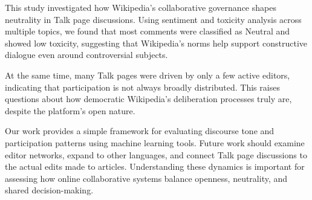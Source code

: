 
\label{sec:conclusion}

This study investigated how Wikipedia’s collaborative governance
shapes neutrality in Talk page discussions. Using sentiment and
toxicity analysis across multiple topics, we found that most comments
were classified as Neutral and showed low toxicity, suggesting that
Wikipedia’s norms help support constructive dialogue even around
controversial subjects.

At the same time, many Talk pages were driven by only a few active
editors, indicating that participation is not always broadly
distributed. This raises questions about how democratic Wikipedia’s
deliberation processes truly are, despite the platform’s open nature.

Our work provides a simple framework for evaluating discourse tone
and participation patterns using machine learning tools. Future work
should examine editor networks, expand to other languages, and
connect Talk page discussions to the actual edits made to articles.
Understanding these dynamics is important for assessing how online
collaborative systems balance openness, neutrality, and shared
decision-making.